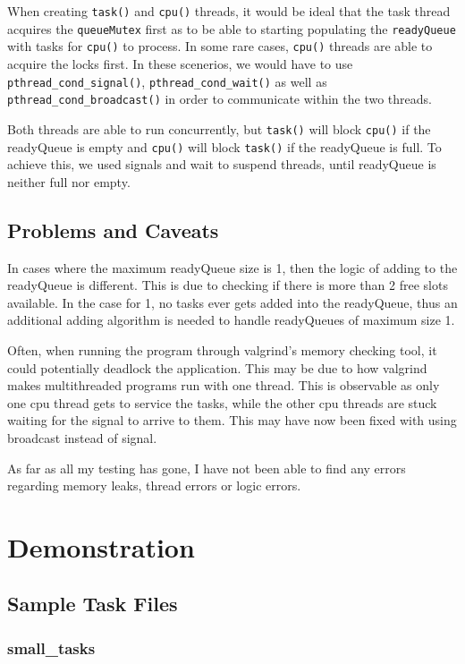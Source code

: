\documentclass[a4paper, 12pt, titlepage]{article}
\newcommand{\code}[1]{\small\texttt{#1}\normalsize}
\begin{document}
When creating \code{task()} and \code{cpu()} threads, it would be ideal
that the task thread acquires the \code{queueMutex} first as to be able to
starting populating the \code{readyQueue} with tasks for \code{cpu()} to
process. In some rare cases, \code{cpu()} threads are able to acquire the
locks first. In these scenerios, we would have to use
\code{pthread\string_cond\string_signal()},
\code{pthread\string_cond\string_wait()} as well as
\code{pthread\string_cond\string_broadcast()} in order to communicate
within the two threads.

Both threads are able to run concurrently, but \code{task()} will block
\code{cpu()} if the readyQueue is empty and \code{cpu()} will block
\code{task()} if the readyQueue is full. To achieve this, we used signals
and wait to suspend threads, until readyQueue is neither full nor empty.

\subsection{Problems and Caveats}
In cases where the maximum readyQueue size is 1, then the logic of adding
to the readyQueue is different. This is due to checking if there is more
than 2 free slots available. In the case for 1, no tasks ever gets added
into the readyQueue, thus an additional adding algorithm is needed to
handle readyQueues of maximum size 1.

Often, when running the program through valgrind's memory checking tool, it
could potentially deadlock the application. This may be due to how valgrind
makes multithreaded programs run with one thread. This is observable as
only one cpu thread gets to service the tasks, while the other cpu threads
are stuck waiting for the signal to arrive to them. This may have now been
fixed with using broadcast instead of signal.

As far as all my testing has gone, I have not been able to find any errors
regarding memory leaks, thread errors or logic errors.

\newpage
\section{Demonstration}

\subsection{Sample Task Files}

\subsubsection{small\_tasks}

\end{document}
